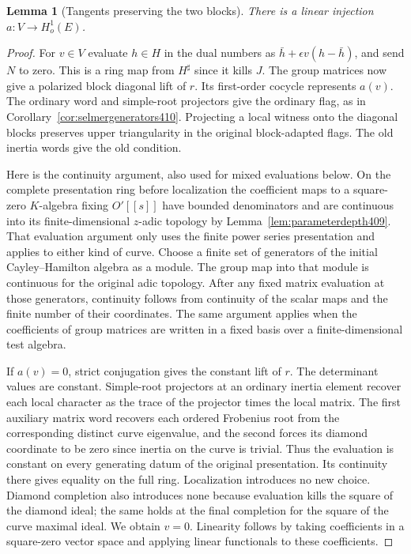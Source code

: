 \documentclass[a4paper,11pt]{article}
\newtheorem{lemma}[proposition]{Lemma}
\theoremstyle{definition}
\theoremstyle{remark}
\numberwithin{equation}{section}
\begin{document}
\begin{lemma}[Tangents preserving the two blocks]\leavevmode
\label{lem:eventangent411}
There is a linear injection \(a:V\to H^1_o(E)\).
\end{lemma}
\begin{proof}
For \(v\in V\) evaluate \(h\in H\) in the dual numbers as
\(\bar h+\epsilon v(h-\bar h)\), and send \(N\) to zero.
This is a ring map from \(H^\sharp\) since it kills \(J\).
The group matrices now give a polarized block diagonal lift
of \(r\). Its first-order cocycle represents \(a(v)\).
The ordinary word and simple-root projectors give the
ordinary flag, as in Corollary~\ref{cor:selmergenerators410}.
Projecting a local witness onto the diagonal blocks preserves
upper triangularity in the original block-adapted flags.
The old inertia words give the old condition.

Here is the continuity argument, also used for mixed
evaluations below. On the complete presentation ring before
localization the coefficient maps to a square-zero
\(K\)-algebra fixing \(O'[[s]]\) have bounded denominators
and are continuous into its finite-dimensional \(z\)-adic
topology by Lemma~\ref{lem:parameterdepth409}. That
evaluation argument only uses the finite power series
presentation and applies to either kind of curve. Choose
a finite set of generators of the initial Cayley--Hamilton
algebra as a module. The group map into that module is
continuous for the original adic topology. After any fixed
matrix evaluation at those generators, continuity follows
from continuity of the scalar maps and the finite number
of their coordinates. The same argument applies when the
coefficients of group matrices are written in a fixed
basis over a finite-dimensional test algebra.

If \(a(v)=0\), strict conjugation gives the constant lift
of \(r\). The determinant values are constant. Simple-root
projectors at an ordinary inertia element recover each
local character as the trace of the projector times the
local matrix. The first auxiliary matrix word recovers
each ordered Frobenius root from the corresponding distinct
curve eigenvalue, and the second forces its diamond
coordinate to be zero since inertia on the curve is trivial.
Thus the evaluation is constant on every generating datum
of the original presentation. Its continuity there gives
equality on the full ring. Localization introduces no new
choice. Diamond completion also introduces none because
evaluation kills the square of the diamond ideal; the same
holds at the final completion for the square of the curve
maximal ideal. We obtain \(v=0\). Linearity follows by
taking coefficients in a square-zero vector space and
applying linear functionals to these coefficients.
\end{proof}
\end{document}
